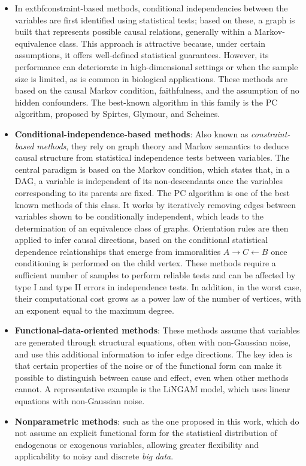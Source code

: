 \documentclass[12pt,a4paper]{report}
\begin{document}
\begin{itemize}
	\item In 	extbf{constraint-based methods}, conditional independencies between the variables are first identified using statistical tests; based on these, a graph is built that represents possible causal relations, generally within a Markov-equivalence class.
	This approach is attractive because, under certain assumptions, it offers well-defined statistical guarantees. However, its performance can deteriorate in high-dimensional settings or when the sample size is limited, as is common in biological applications.
	These methods are based on the causal Markov condition, faithfulness, and the assumption of no hidden confounders. The best-known algorithm in this family is the PC algorithm, proposed by Spirtes, Glymour, and Scheines\cite{observacionales}.
    
    \item \textbf{Conditional-independence-based methods}:
     Also known as \textit{constraint-based methods}, they rely on graph theory and Markov semantics to deduce causal structure from statistical independence tests between variables\cite{restricciones}. The central paradigm is based on the Markov condition, which states that, in a DAG, a variable is independent of its non-descendants once the variables corresponding to its parents are fixed.
     The PC algorithm is one of the best known methods of this class\cite{pc}. It works by iteratively removing edges between variables shown to be conditionally independent, which leads to the determination of an equivalence class of graphs. Orientation rules are then applied to infer causal directions, based on the conditional statistical dependence relationships that emerge from immoralities \( A \rightarrow C \leftarrow B \) once conditioning is performed on the child vertex.
     These methods require a sufficient number of samples to perform reliable tests and can be affected by type I and type II errors in independence tests. In addition, in the worst case, their computational cost grows as a power law of the number of vertices, with an exponent equal to the maximum degree.
    
    \item \textbf{Functional-data-oriented methods}:
		These methods assume that variables are generated through structural equations, often with non-Gaussian noise, and use this additional information to infer edge directions.
		The key idea is that certain properties of the noise or of the functional form can make it possible to distinguish between cause and effect, even when other methods cannot. A representative example is the LiNGAM model, which uses linear equations with non-Gaussian noise.
    
  
    \item \textbf{Nonparametric methods}: such as the one proposed in this work, which do not assume an explicit functional form for the statistical distribution of endogenous or exogenous variables, allowing greater flexibility and applicability to noisy and discrete \textit{big data}.
\end{itemize}
\end{document}
